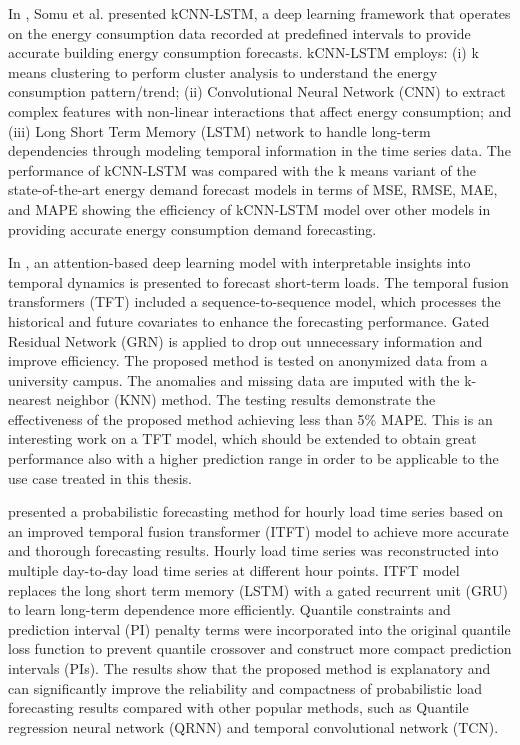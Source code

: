 In \cite{SOMU2021110591}, Somu et al. presented kCNN-LSTM, a deep learning framework that operates on the energy consumption data recorded at predefined intervals to provide accurate building energy consumption forecasts.
kCNN-LSTM employs:
(i) k means clustering to perform cluster analysis to understand the energy consumption pattern\slash trend;
(ii) Convolutional Neural Network (CNN) to extract complex features with non-linear interactions that affect energy consumption;
and (iii) Long Short Term Memory (LSTM) network to handle long-term dependencies through modeling temporal information in the time series data.
The performance of kCNN-LSTM was compared with the k means variant of the state-of-the-art energy demand forecast models in terms of MSE, RMSE, MAE, and MAPE showing the efficiency of kCNN-LSTM model over other models in providing accurate energy consumption demand forecasting.

In \cite{10033079}, an attention-based deep learning model with interpretable insights into temporal dynamics is presented to forecast short-term loads.
The temporal fusion transformers (TFT) included a sequence-to-sequence model, which processes the historical and future covariates to enhance the forecasting performance.
Gated Residual Network (GRN) is applied to drop out unnecessary information and improve efficiency.
The proposed method is tested on anonymized data from a university campus.
The anomalies and missing data are imputed with the k-nearest neighbor (KNN) method.
The testing results demonstrate the effectiveness of the proposed method achieving less than 5\% MAPE.
This is an interesting work on a TFT model, which should be extended to obtain great performance also with a higher prediction range in order to be applicable to the use case treated in this thesis.

\cite{LI2023108743} presented a probabilistic forecasting method for hourly load time series based on an improved temporal fusion transformer (ITFT) model to achieve more accurate and thorough forecasting results.
Hourly load time series was reconstructed into multiple day-to-day load time series at different hour points.
ITFT model replaces the long short term memory (LSTM) with a gated recurrent unit (GRU) to learn long-term dependence more efficiently.
Quantile constraints and prediction interval (PI) penalty terms were incorporated into the original quantile loss function to prevent quantile crossover and construct more compact prediction intervals (PIs).
The results show that the proposed method is explanatory and can significantly improve the reliability and compactness of probabilistic load forecasting results compared with other popular methods, such as Quantile regression neural network (QRNN) and temporal convolutional network (TCN).


